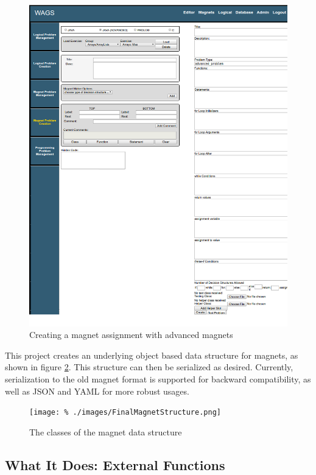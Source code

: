 \documentclass[letter,10pt,final]{article}
\begin{document}
\begin{figure}[h!]
 \centering
 \includegraphics{./images/wags-adv-magnet-creation.png}
 \caption{Creating a magnet assignment with advanced magnets}
 \label{fig:wags-adv-magnet-creation}
\end{figure}


This project creates an underlying object based data structure for 
magnets, as shown in figure \ref{fig:magnet-diagram}. This structure 
can then be serialized as desired. Currently, serialization to the old 
magnet format is supported for backward compatibility, as well as JSON 
and YAML for more robust usages.

\begin{figure}[h!]
 \centering
 \texttt{[image: \%
./images/FinalMagnetStructure.png]}
 \caption{The classes of the magnet data structure}
 \label{fig:magnet-diagram}
\end{figure}



\subsection{What It Does: External Functions}
\end{document}
